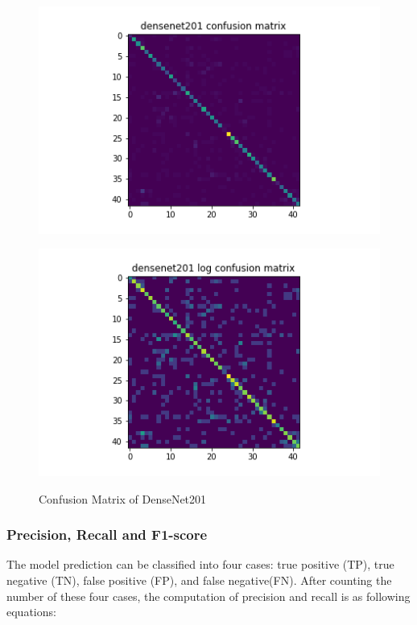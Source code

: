 \begin{figure}[H]
\begin{minipage}[b]{.5\linewidth}
    {\includegraphics[width=1.2\textwidth]{figs/conf_matrix/densenet201_conf.png}}
  \end{minipage}
  \hfill
  \begin{minipage}[b]{.5\linewidth}
    \centering

    {\includegraphics[width=1.2\textwidth]{figs/conf_matrix/densenet201_log_conf.png}}
  \end{minipage}


  \caption{Confusion Matrix of DenseNet201}
  \label{fig:densenet201_conf}
  \vspace{0.2in}
\end{figure}

\subsubsection{Precision, Recall and F1-score}
The model prediction can be classified into four cases: true positive (TP), true negative (TN), false positive (FP), and false negative(FN). After counting the number of these four cases, the computation of precision and recall is as following equations:


